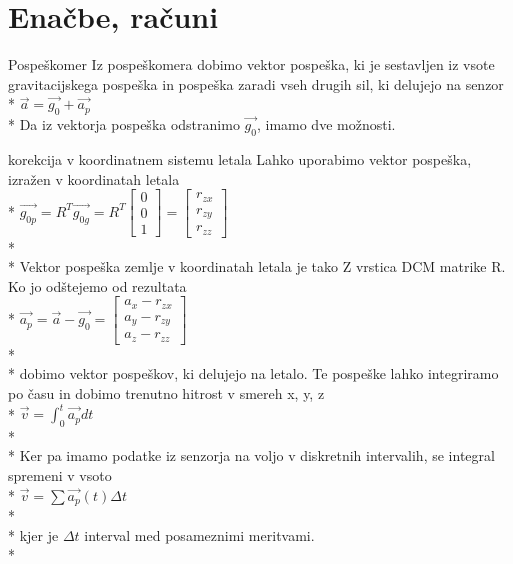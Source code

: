 \documentclass[]{article}
\begin{document}
\section{Enačbe, računi}
\begin {subsection}{Pospeškomer}
Iz pospeškomera dobimo vektor pospeška, ki je sestavljen iz vsote gravitacijskega pospeška in pospeška zaradi vseh drugih sil, ki delujejo na senzor\\*
$ \vec{a} = \vec{g_{0}} + \vec{a_{p}} $\\*
Da iz vektorja pospeška odstranimo $ \vec{g_{0}} $, imamo dve možnosti.
\begin{subsubsection}{korekcija v koordinatnem sistemu letala}
 Lahko uporabimo vektor pospeška, izražen v koordinatah letala\\*
$ \vec{g_{0p}} = R^{T}  \vec{g_{0g}} = R^{T}  \left[ \begin{array}{c}
0 \\ 
0 \\ 
1
\end{array} \right] = \left[ \begin{array}{c}
r_{zx} \\ 
r_{zy} \\ 
r_{zz}
\end{array} \right]  $\\*\\*
Vektor pospeška zemlje v koordinatah letala je tako Z vrstica DCM matrike R. Ko jo odštejemo od rezultata\\*
$ \vec{a_{p}} = \vec{a} - \vec{g_{0}} = \left[ \begin{array}{c}
a_{x} - r_{zx} \\ 
a_{y} - r_{zy} \\ 
a_{z} - r_{zz}
\end{array} \right] $\\*\\*
dobimo vektor pospeškov, ki delujejo na letalo. Te pospeške lahko integriramo po času in dobimo trenutno hitrost v smereh x, y, z\\*
$ \vec{v} = \int_0^t{\vec{a_{p}} dt} $\\*\\*
Ker pa imamo podatke iz senzorja na voljo v diskretnih intervalih, se integral spremeni v vsoto\\*
$ \vec{v} = \sum \vec{a_{p}}(t) \Delta t $\\*\\*
kjer je $ \Delta t $ interval med posameznimi meritvami.\\*

\end{subsubsection}
\end{subsection}
\end{document}
